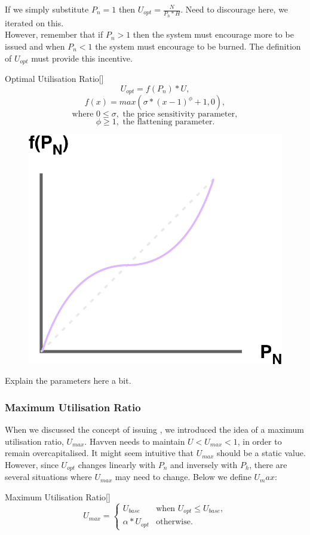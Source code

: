 \noindent If we simply substitute $P_n = 1$ then $U_{opt} = \frac{N}{P_h * H}$. Need to discourage here, we iterated on this. \\

\noindent However, remember that if $P_n > 1$ then the system must encourage more \NOM{} to be issued and when $P_n < 1$ the system must encourage \NOM{} to be burned. The definition of $U_{opt}$ must provide this incentive. \\

\begin{namedthm}{Optimal Utilisation Ratio}[]
$$ U_{opt} = f(P_n) * U,$$
$$ f(x) = max(\sigma * (x - 1)^{\phi} + 1, 0), $$
$$\text{where } 0 \leq \sigma, \text{ the price sensitivity parameter}, $$
$$\phi \geq 1, \text{ the flattening parameter}. $$
\end{namedthm}

\begin{figure}[h!]
    \centering
    \includegraphics[width=.5\textwidth]{img/U_opt}
\end{figure}

\newpage

\noindent Explain the parameters here a bit.

\subsubsection*{Maximum Utilisation Ratio}

\noindent When we discussed the concept of issuing \NOM{}, we introduced the idea of a maximum utilisation ratio, $U_{max}$. Havven needs to maintain $U < U_{max} < 1$, in order to remain overcapitalised. It might seem intuitive that $U_{max}$ should be a static value. However, since $U_{opt}$ changes linearly with $P_n$ and inversely with $P_h$, there are several situations where $U_{max}$ may need to change. Below we define $U_max$:

\begin{namedthm}{Maximum Utilisation Ratio}[]
\[
U_{max} = 
\begin{cases}
 U_{base} &\mbox{when } U_{opt} \leq U_{base}, \\ 
 \alpha * U_{opt} &\mbox{otherwise}.
 \end{cases}
\]
\end{namedthm}

